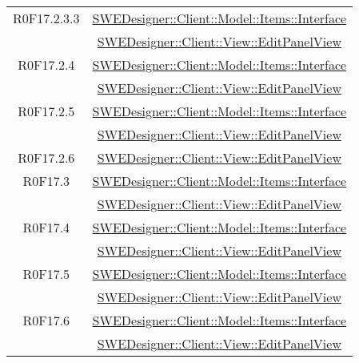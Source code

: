 \documentclass[../DefinizioneDiProdotto.tex]{subfiles}
\begin{document}
\begin{longtable}{|c|c|}
				R0F17.2.3.3
				& \hyperlink{SWEDesigner::Client::Model::Items::Interface}{SWEDesigner::Client::Model::Items::Interface}\\
				& \hyperlink{SWEDesigner::Client::View::EditPanelView}{SWEDesigner::Client::View::EditPanelView}\\
				\hline

				R0F17.2.4
				& \hyperlink{SWEDesigner::Client::Model::Items::Interface}{SWEDesigner::Client::Model::Items::Interface}\\
				& \hyperlink{SWEDesigner::Client::View::EditPanelView}{SWEDesigner::Client::View::EditPanelView}\\
				\hline

				R0F17.2.5
				& \hyperlink{SWEDesigner::Client::Model::Items::Interface}{SWEDesigner::Client::Model::Items::Interface}\\
				& \hyperlink{SWEDesigner::Client::View::EditPanelView}{SWEDesigner::Client::View::EditPanelView}\\
				\hline

				R0F17.2.6
				& \hyperlink{SWEDesigner::Client::View::EditPanelView}{SWEDesigner::Client::View::EditPanelView}\\
				\hline

				R0F17.3
				& \hyperlink{SWEDesigner::Client::Model::Items::Interface}{SWEDesigner::Client::Model::Items::Interface}\\
				& \hyperlink{SWEDesigner::Client::View::EditPanelView}{SWEDesigner::Client::View::EditPanelView}\\
				\hline

				R0F17.4
				& \hyperlink{SWEDesigner::Client::Model::Items::Interface}{SWEDesigner::Client::Model::Items::Interface}\\
				& \hyperlink{SWEDesigner::Client::View::EditPanelView}{SWEDesigner::Client::View::EditPanelView}\\
				\hline

				R0F17.5
				& \hyperlink{SWEDesigner::Client::Model::Items::Interface}{SWEDesigner::Client::Model::Items::Interface}\\
				& \hyperlink{SWEDesigner::Client::View::EditPanelView}{SWEDesigner::Client::View::EditPanelView}\\
				\hline

				R0F17.6
				& \hyperlink{SWEDesigner::Client::Model::Items::Interface}{SWEDesigner::Client::Model::Items::Interface}\\
				& \hyperlink{SWEDesigner::Client::View::EditPanelView}{SWEDesigner::Client::View::EditPanelView}\\
				\hline


\end{longtable}
\end{document}
